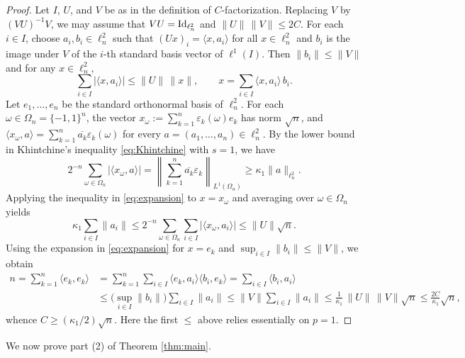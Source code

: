 \documentclass[11pt,reqno]{amsart}
\theoremstyle{definition}
\theoremstyle{plain}
\begin{document}
\begin{proof}
Let $I$, $U$, and $V$ be as in the definition of $C$-factorization. Replacing $V$ by $(VU)^{-1}V$, we may assume that $VU=\textup{Id}_{\ell^2_n}$ and $\|U\|\,\|V\|\le2C$. For each $i\in I$, choose $a_i,b_i\in\ell^2_n$ such that $(Ux)_i=\langle x,a_i\rangle$ for all $x\in\ell^2_n$ and $b_i$ is the image under $V$ of the $i$-th standard basis vector of $\ell^1(I)$. Then $\|b_i\|\le\|V\|$ and for any $ x\in\ell^2_n$,
\begin{equation}\label{eq:expansion}
\sum_{i\in I}|\langle x,a_i\rangle|\le\|U\|\,\|x\|,\qquad x=\sum_{i\in I}\langle x,a_i\rangle\,b_i.
\end{equation}
Let $e_1,\dots,e_n$ be the standard orthonormal basis of $\ell^2_n$. For each $\omega\in\Omega_n=\{-1,1\}^n$, the vector $x_\omega:=\sum_{k=1}^n\varepsilon_k(\omega)e_k$ has norm $\sqrt n$, and $\langle x_\omega,a\rangle=\sum_{k=1}^n\overline{a_k}\varepsilon_k(\omega)$ for every $a=(a_1,\dots,a_n)\in\ell^2_n$. By the lower bound in Khintchine's inequality \eqref{eq:Khintchine} with $s=1$, we have
\[
2^{-n}\sum_{\omega\in\Omega_n}|\langle x_\omega,a\rangle|
=\left\|\sum_{k=1}^n\overline{a_k}\varepsilon_k\right\|_{L^1(\Omega_n)}
\ge \kappa_1\|a\|_{\ell^2_n}.
\]
Applying the inequality in \eqref{eq:expansion} to $x=x_\omega$ and averaging over $\omega\in\Omega_n$ yields
\[
\kappa_1\sum_{i\in I}\|a_i\|
\le 2^{-n}\sum_{\omega\in\Omega_n}\sum_{i\in I}|\langle x_\omega,a_i\rangle|
\le \|U\|\sqrt n.
\]
Using the expansion in \eqref{eq:expansion} for $x=e_k$ and $\sup_{i\in I}\|b_i\|\le\|V\|$, we obtain
\[
\begin{aligned}
n=\sum_{k=1}^n\langle e_k,e_k\rangle
&=\sum_{k=1}^n\sum_{i\in I}\langle e_k,a_i\rangle\langle b_i,e_k\rangle
=\sum_{i\in I}\langle b_i,a_i\rangle\\
&\le\Big(\sup_{i\in I}\|b_i\|\Big)\sum_{i\in I}\|a_i\|
\le\|V\|\sum_{i\in I}\|a_i\|
\le\frac{1}{\kappa_1}\,\|U\|\,\|V\|\sqrt n
\le\frac{2C}{\kappa_1}\sqrt n,
\end{aligned}
\]
whence $C\ge(\kappa_1/2)\sqrt n$. Here the first $\leq$ above relies essentially on $p=1$.
\end{proof}

We now prove part (2) of Theorem \ref{thm:main}.
\end{document}
